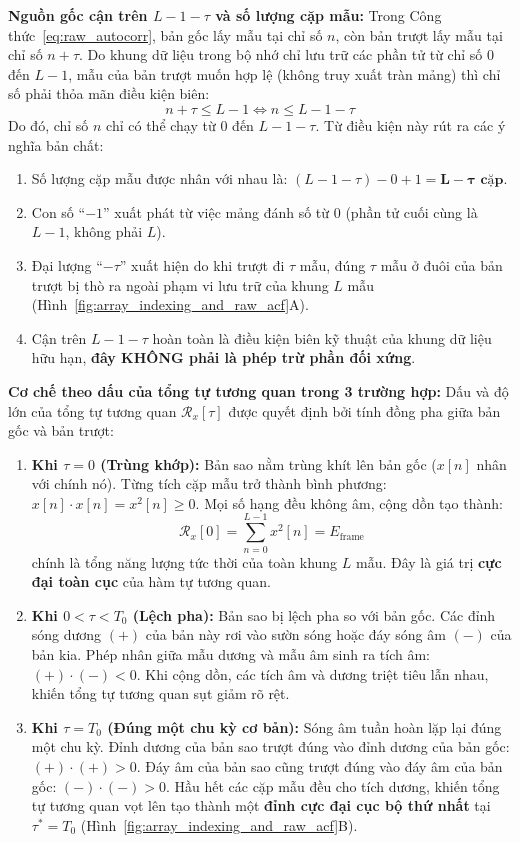 \documentclass[11pt,a4paper]{article}
\begin{document}
\textbf{Nguồn gốc cận trên $L - 1 - \tau$ và số lượng cặp mẫu:}
Trong Công thức~\eqref{eq:raw_autocorr}, bản gốc lấy mẫu tại chỉ số $n$, còn bản trượt lấy mẫu tại chỉ số $n + \tau$. Do khung dữ liệu trong bộ nhớ chỉ lưu trữ các phần tử từ chỉ số $0$ đến $L - 1$, mẫu của bản trượt muốn hợp lệ (không truy xuất tràn mảng) thì chỉ số phải thỏa mãn điều kiện biên:
\begin{equation}
n + \tau \le L - 1 \iff n \le L - 1 - \tau
\label{eq:boundary_cond}
\end{equation}
Do đó, chỉ số $n$ chỉ có thể chạy từ $0$ đến $L - 1 - \tau$. Từ điều kiện này rút ra các ý nghĩa bản chất:
\begin{enumerate}
    \setlength{\itemsep}{0.5pt}
    \item Số lượng cặp mẫu được nhân với nhau là: $(L - 1 - \tau) - 0 + 1 = \mathbf{L - \tau\text{ cặp}}$.
    \item Con số ``$-1$'' xuất phát từ việc mảng đánh số từ $0$ (phần tử cuối cùng là $L - 1$, không phải $L$).
    \item Đại lượng ``$-\tau$'' xuất hiện do khi trượt đi $\tau$ mẫu, đúng $\tau$ mẫu ở đuôi của bản trượt bị thò ra ngoài phạm vi lưu trữ của khung $L$ mẫu (Hình~\ref{fig:array_indexing_and_raw_acf}A).
    \item Cận trên $L - 1 - \tau$ hoàn toàn là điều kiện biên kỹ thuật của khung dữ liệu hữu hạn, \textbf{đây KHÔNG phải là phép trừ phần đối xứng}.
\end{enumerate}

\textbf{Cơ chế theo dấu của tổng tự tương quan trong 3 trường hợp:}
Dấu và độ lớn của tổng tự tương quan $\mathcal{R}_x[\tau]$ được quyết định bởi tính đồng pha giữa bản gốc và bản trượt:
\begin{enumerate}
    \setlength{\itemsep}{0.5pt}
    \item \textbf{Khi $\tau = 0$ (Trùng khớp):} Bản sao nằm trùng khít lên bản gốc ($x[n]$ nhân với chính nó). Từng tích cặp mẫu trở thành bình phương: $x[n] \cdot x[n] = x^2[n] \ge 0$. Mọi số hạng đều không âm, cộng dồn tạo thành:
    \[
    \mathcal{R}_x[0] = \sum_{n=0}^{L - 1} x^2[n] = E_{\text{frame}}
    \]
    chính là tổng năng lượng tức thời của toàn khung $L$ mẫu. Đây là giá trị \textbf{cực đại toàn cục} của hàm tự tương quan.
    \item \textbf{Khi $0 < \tau < T_0$ (Lệch pha):} Bản sao bị lệch pha so với bản gốc. Các đỉnh sóng dương $(+)$ của bản này rơi vào sườn sóng hoặc đáy sóng âm $(-)$ của bản kia. Phép nhân giữa mẫu dương và mẫu âm sinh ra tích âm: $(+) \cdot (-) < 0$. Khi cộng dồn, các tích âm và dương triệt tiêu lẫn nhau, khiến tổng tự tương quan sụt giảm rõ rệt.
    \item \textbf{Khi $\tau = T_0$ (Đúng một chu kỳ cơ bản):} Sóng âm tuần hoàn lặp lại đúng một chu kỳ. Đỉnh dương của bản sao trượt đúng vào đỉnh dương của bản gốc: $(+) \cdot (+) > 0$. Đáy âm của bản sao cũng trượt đúng vào đáy âm của bản gốc: $(-) \cdot (-) > 0$. Hầu hết các cặp mẫu đều cho tích dương, khiến tổng tự tương quan vọt lên tạo thành một \textbf{đỉnh cực đại cục bộ thứ nhất} tại $\tau^* = T_0$ (Hình~\ref{fig:array_indexing_and_raw_acf}B).
\end{enumerate}
\end{document}
